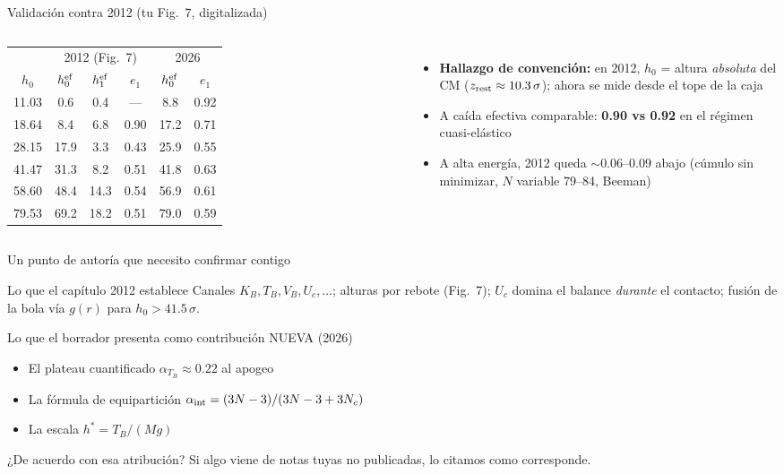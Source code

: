 \documentclass[11pt,aspectratio=169]{beamer}
\begin{document}
\begin{frame}{Validación contra 2012 (tu Fig.~7, digitalizada)}
\begin{columns}[T]
\small
\begin{tabular}{c|ccc|cc}
\toprule
 & \multicolumn{3}{c|}{2012 (Fig.~7)} & \multicolumn{2}{c}{2026} \\
$h_0$ & $h_0^{\rm ef}$ & $h_1^{\rm ef}$ & $e_1$ & $h_0^{\rm ef}$ & $e_1$ \\
\midrule
11.03 &  0.6 &  0.4 & ---  &  8.8 & 0.92 \\
18.64 &  8.4 &  6.8 & 0.90 & 17.2 & 0.71 \\
28.15 & 17.9 &  3.3 & 0.43 & 25.9 & 0.55 \\
41.47 & 31.3 &  8.2 & 0.51 & 41.8 & 0.63 \\
58.60 & 48.4 & 14.3 & 0.54 & 56.9 & 0.61 \\
79.53 & 69.2 & 18.2 & 0.51 & 79.0 & 0.59 \\
\bottomrule
\end{tabular}
\begin{itemize}
    \item \textbf{Hallazgo de convención:} en 2012, $h_0$ = altura
    \emph{absoluta} del CM ($z_{\rm rest}\approx10.3\,\sigma$);
    ahora se mide desde el tope de la caja
    \item A caída efectiva comparable: \textbf{0.90 vs 0.92} en el
    régimen cuasi-elástico
    \item A alta energía, 2012 queda $\sim$0.06--0.09 abajo
    (cúmulo sin minimizar, $N$ variable 79--84, Beeman)
\end{itemize}
\end{columns}
\end{frame}

\begin{frame}{Un punto de autoría que necesito confirmar contigo}
\begin{block}{Lo que el capítulo 2012 establece}
Canales $K_B, T_B, V_B, U_c, \ldots$; alturas por rebote (Fig.~7);
$U_c$ domina el balance \emph{durante} el contacto; fusión de la bola
vía $g(r)$ para $h_0>41.5\,\sigma$.
\end{block}
\begin{alertblock}{Lo que el borrador presenta como contribución NUEVA (2026)}
\begin{itemize}
    \item El plateau cuantificado $\alpha_{T_B}\approx0.22$ al apogeo
    \item La fórmula de equipartición
    $\alpha_{\rm int}=(3N-3)/(3N-3+3N_c)$
    \item La escala $h^*=T_B/(Mg)$
\end{itemize}
\end{alertblock}
\centering
¿De acuerdo con esa atribución? Si algo viene de notas tuyas no
publicadas, lo citamos como corresponde.
\end{frame}
\end{document}
